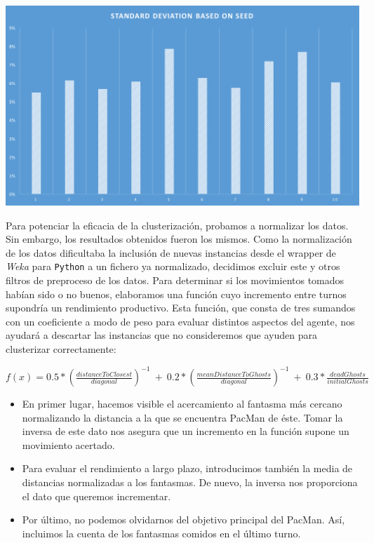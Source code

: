 \documentclass[12pt]{article}
\begin{document}
\begin{center}
    \includegraphics[width=15cm]{stdff}
\end{center}


Para potenciar la eficacia de la clusterización, probamos a normalizar los datos. Sin embargo, los resultados obtenidos fueron los mismos. Como la normalización de los datos dificultaba la inclusión de nuevas instancias desde el wrapper de \emph{Weka} para \texttt{Python} a un fichero ya normalizado, decidimos excluir este y otros filtros de preproceso de los datos. Para determinar si los movimientos tomados habían sido o no buenos, elaboramos una función cuyo incremento entre turnos supondría un rendimiento productivo. Esta función, que consta de tres sumandos con un coeficiente a modo de peso para evaluar distintos aspectos del agente, nos ayudará a descartar las instancias que no consideremos que ayuden para clusterizar correctamente:
\begin{center}
    $ f(x) =  0.5*(\frac{distanceToClosest}{diagonal})^{-1}\ +\ 0.2*(\frac{meanDistanceToGhosts}{diagonal})^{-1}\ +\ 0.3*\frac{deadGhosts}{initialGhosts} $
\end{center}

\begin{itemize}
    \item En primer lugar, hacemos visible el acercamiento al fantasma más cercano normalizando la distancia a la que se encuentra PacMan de éste. Tomar la inversa de este dato nos asegura que un incremento en la función supone un movimiento acertado.
    \item Para evaluar el rendimiento a largo plazo, introducimos también la media de distancias normalizadas a los fantasmas. De nuevo, la inversa nos proporciona el dato que queremos incrementar.
    \item Por último, no podemos olvidarnos del objetivo principal del PacMan. Así, incluimos la cuenta de los fantasmas comidos en el último turno.
\end{itemize}
\end{document}
